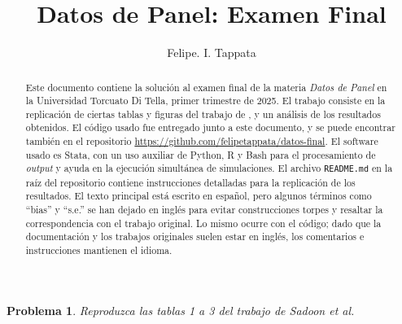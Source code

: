 \documentclass[12pt,letterpaper,reqno,oneside]{amsart}
\theoremstyle{problemstyle} %
\newtheorem{problem}{Problema}
\theoremstyle{definition} %
\renewcommand{\thesolution}{\theproblem~(\alph{solution})}
\begin{document}
\author[F. I. Tappata]{Felipe. I. Tappata}
\date{}

\title[Examen Final]{Datos de Panel: Examen Final}
\begin{abstract}
  Este documento contiene la solución al examen final de la materia \emph{Datos de Panel} en la Universidad Torcuato Di Tella, primer trimestre de 2025.
  El trabajo consiste en la replicación de ciertas tablas y figuras del trabajo de \textcite{al-sadoonSimpleMethodsConsistent2019}, y un análisis de los resultados obtenidos.
  El código usado fue entregado junto a este documento, y se puede encontrar también en el repositorio \url{https://github.com/felipetappata/datos-final}.
  El software usado es Stata, con un uso auxiliar de Python, R y Bash para el procesamiento de \emph{output} y ayuda en la ejecución simultánea de simulaciones.
  El archivo \texttt{README.md} en la raíz del repositorio contiene instrucciones detalladas para la replicación de los resultados.
  El texto principal está escrito en español, pero algunos términos como \enquote{bias} y \enquote{s.e.} se han dejado en inglés para evitar construcciones torpes y resaltar la correspondencia con el trabajo original.
  Lo mismo ocurre con el código; dado que la documentación y los trabajos originales suelen estar en inglés, los comentarios e instrucciones mantienen el idioma.
\end{abstract}
\maketitle
\begin{mdframed}
  \begin{problem}
  \label{prob:1}
  Reproduzca las tablas 1 a 3 del trabajo de Sadoon et al.
  \end{problem}
\end{mdframed}
\begingroup
\renewcommand{\thesolution}{\theproblem}
\end{document}
